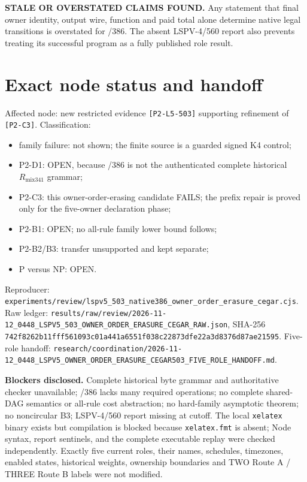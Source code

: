 \documentclass[11pt]{article}
\newcommand{\Rmix}{R_{\mathrm{mix341}}}
\begin{document}
\textbf{STALE OR OVERSTATED CLAIMS FOUND.} Any statement that final owner identity, output wire, function and paid total alone determine native legal transitions is overstated for /386.  The absent LSPV-4/560 report also prevents treating its successful program as a fully published role result.

\section{Exact node status and handoff}
Affected node: new restricted evidence \texttt{[P2-L5-503]} supporting refinement of \texttt{[P2-C3]}.  Classification:
\begin{itemize}
\item family failure: not shown; the finite source is a guarded signed K4 control;
\item P2-D1: OPEN, because /386 is not the authenticated complete historical \(\Rmix\) grammar;
\item P2-C3: this owner-order-erasing candidate FAILS; the prefix repair is proved only for the five-owner declaration phase;
\item P2-B1: OPEN; no all-rule family lower bound follows;
\item P2-B2/B3: transfer unsupported and kept separate;
\item P versus NP: OPEN.
\end{itemize}

Reproducer: \texttt{experiments/review/lspv5\_503\_native386\_owner\_order\_erasure\_cegar.cjs}.  Raw ledger: \texttt{results/raw/review/2026-11-12\_0448\_LSPV5\_503\_OWNER\_ORDER\_ERASURE\_CEGAR\_RAW.json}, SHA-256 \texttt{742f8262b11fff561093c01a441a6551f038c22873dfe22a3d8376d87ae21595}.  Five-role handoff: \texttt{research/coordination/2026-11-12\_0448\_LSPV5\_OWNER\_ORDER\_ERASURE\_CEGAR503\_FIVE\_ROLE\_HANDOFF.md}.

\textbf{Blockers disclosed.} Complete historical byte grammar and authoritative checker unavailable; /386 lacks many required operations; no complete shared-DAG semantics or all-rule cost abstraction; no hard-family asymptotic theorem; no noncircular B3; LSPV-4/560 report missing at cutoff.  The local \texttt{xelatex} binary exists but compilation is blocked because \texttt{xelatex.fmt} is absent; Node syntax, report sentinels, and the complete executable replay were checked independently.  Exactly five current roles, their names, schedules, timezones, enabled states, historical weights, ownership boundaries and TWO Route A / THREE Route B labels were not modified.
\end{document}
